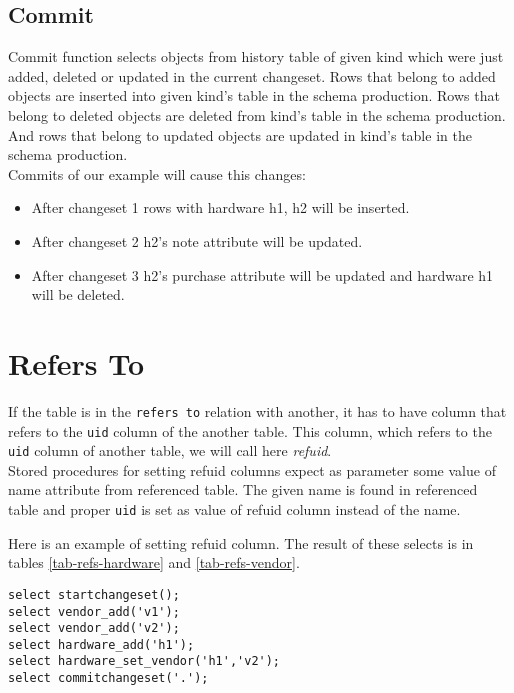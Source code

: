 \documentclass[deska]{subfiles}
\begin{document}
\subsection{Commit}
Commit function selects objects from history table of given kind which were just added, deleted or updated in the current changeset. Rows that belong to added objects are inserted into given kind's table in the schema production. Rows that belong to deleted objects are deleted from kind's table in the schema production. And rows that belong to updated objects are updated in kind's table in the schema production.\\
Commits of our example will cause this changes:
\begin{itemize}
    \item After changeset 1 rows with hardware h1, h2 will be inserted.
    \item After changeset 2 h2's note attribute will be updated.
    \item After changeset 3 h2's purchase attribute will be updated and hardware h1 will be deleted.
\end{itemize}

\section{Refers To}
If the table is in the {\tt refers to} relation with another, it has to have column that refers to the {\tt uid} column of the another table. This column, which refers to the {\tt uid} column of another table, we will call here {\em refuid}.\\
Stored procedures for setting refuid columns expect as parameter some value of name attribute from referenced table. The given name is found in referenced table and proper {\tt uid} is set as value of refuid column instead of the name.

Here is an example of setting refuid column. The result of these selects is in tables \ref{tab-refs-hardware} and  \ref{tab-refs-vendor}.
\begin{verbatim}
select startchangeset();
select vendor_add('v1');
select vendor_add('v2');
select hardware_add('h1');
select hardware_set_vendor('h1','v2');
select commitchangeset('.');
\end{verbatim}
\end{document}
